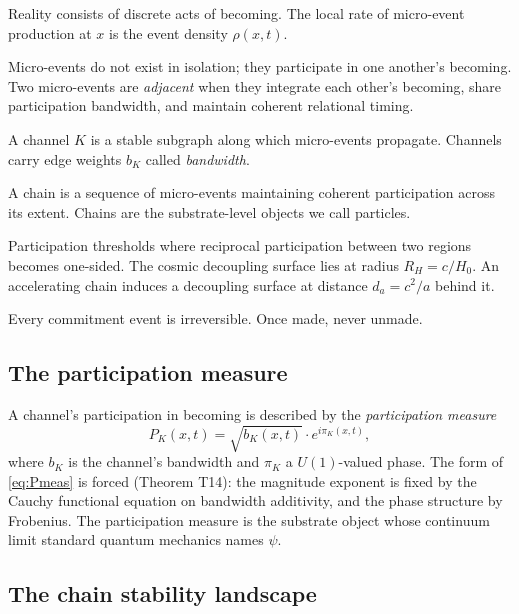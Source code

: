 \documentclass[11pt,a4paper]{article}
\begin{document}
\begin{description}[leftmargin=1em, itemsep=2pt]
\item[Micro-events.] Reality consists of discrete acts of becoming. The local rate of micro-event production at $x$ is the event density $\rho(x,t)$.
\item[Participation and adjacency.] Micro-events do not exist in isolation; they participate in one another's becoming. Two micro-events are \emph{adjacent} when they integrate each other's becoming, share participation bandwidth, and maintain coherent relational timing.
\item[Channels.] A channel $K$ is a stable subgraph along which micro-events propagate. Channels carry edge weights $b_K$ called \emph{bandwidth}.
\item[Chains.] A chain is a sequence of micro-events maintaining coherent participation across its extent. Chains are the substrate-level objects we call particles.
\item[Decoupling surfaces.] Participation thresholds where reciprocal participation between two regions becomes one-sided. The cosmic decoupling surface lies at radius $R_H = c/H_0$. An accelerating chain induces a decoupling surface at distance $d_a = c^2/a$ behind it.
\item[Commitment irreversibility (P11).] Every commitment event is irreversible. Once made, never unmade.
\end{description}

\subsection{The participation measure}

A channel's participation in becoming is described by the \emph{participation measure}
\begin{equation}
P_K(x,t) = \sqrt{b_K(x,t)} \cdot e^{i \pi_K(x,t)},
\label{eq:Pmeas}
\end{equation}
where $b_K$ is the channel's bandwidth and $\pi_K$ a $U(1)$-valued phase. The form of \eqref{eq:Pmeas} is forced (Theorem T14): the magnitude exponent is fixed by the Cauchy functional equation on bandwidth additivity, and the phase structure by Frobenius. The participation measure is the substrate object whose continuum limit standard quantum mechanics names $\psi$.

\subsection{The chain stability landscape}
\end{document}
